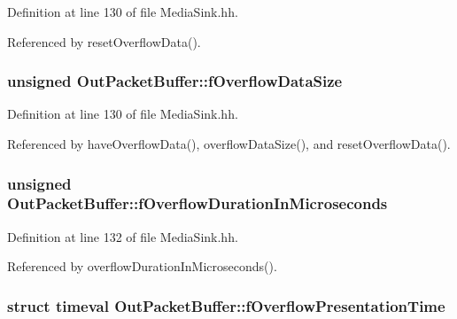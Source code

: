 Definition at line 130 of file Media\+Sink.\+hh.



Referenced by reset\+Overflow\+Data().

\subsubsection[{f\+Overflow\+Data\+Size}]{\setlength{\rightskip}{0pt plus 5cm}unsigned Out\+Packet\+Buffer\+::f\+Overflow\+Data\+Size\hspace{0.3cm}{\ttfamily [private]}}\label{classOutPacketBuffer_a3399e5309a3237730cd2932fd1293a40}


Definition at line 130 of file Media\+Sink.\+hh.



Referenced by have\+Overflow\+Data(), overflow\+Data\+Size(), and reset\+Overflow\+Data().

\subsubsection[{f\+Overflow\+Duration\+In\+Microseconds}]{\setlength{\rightskip}{0pt plus 5cm}unsigned Out\+Packet\+Buffer\+::f\+Overflow\+Duration\+In\+Microseconds\hspace{0.3cm}{\ttfamily [private]}}\label{classOutPacketBuffer_a2af838d31bdf73ea6cef84fd126548b6}


Definition at line 132 of file Media\+Sink.\+hh.



Referenced by overflow\+Duration\+In\+Microseconds().

\subsubsection[{f\+Overflow\+Presentation\+Time}]{\setlength{\rightskip}{0pt plus 5cm}struct timeval Out\+Packet\+Buffer\+::f\+Overflow\+Presentation\+Time\hspace{0.3cm}{\ttfamily [private]}}\label{classOutPacketBuffer_a0c1567bec145a51e55f34d7b1cbe1ae7}


